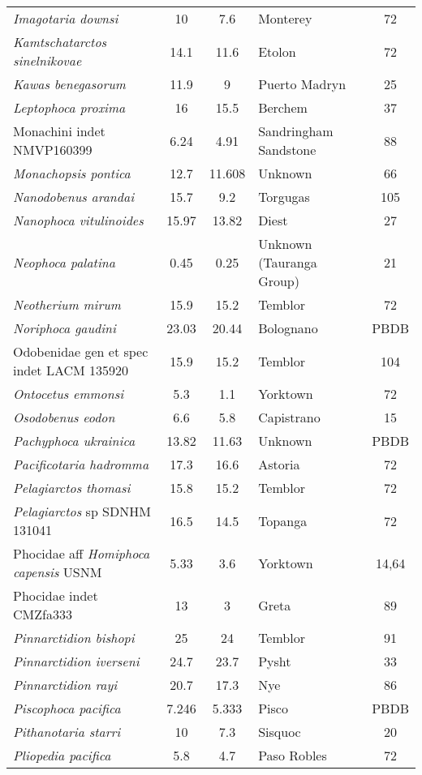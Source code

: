 \begin{longtable}{p{}cclc}
\textit{Imagotaria downsi} & 	10	&	7.6	&	Monterey	&72\\
\textit{Kamtschatarctos sinelnikovae} & 	14.1	&	11.6	&	Etolon	&72\\
\textit{Kawas benegasorum} & 	11.9	&	9	&	Puerto Madryn	&25\\
\textit{Leptophoca proxima} & 	16	&	15.5	&	Berchem	&37\\
Monachini indet NMVP160399 & 	6.24	&	4.91	&	Sandringham Sandstone	&88\\
\textit{Monachopsis pontica} & 	12.7	&	11.608	&	Unknown	&66\\
\textit{Nanodobenus arandai} & 	15.7	&	9.2	&	Torgugas	&105\\
\textit{Nanophoca vitulinoides} & 	15.97	&	13.82	&	Diest	&27\\
\textit{Neophoca palatina} & 	0.45	&	0.25	&	Unknown (Tauranga Group)	&21\\
\textit{Neotherium mirum} & 	15.9	&	15.2	&	Temblor	&72\\
\textit{Noriphoca gaudini} & 	23.03	&	20.44	&	Bolognano	&PBDB\\
Odobenidae gen et spec indet LACM 135920 & 	15.9	&	15.2	&	Temblor	&104\\
\textit{Ontocetus emmonsi} & 	5.3	&	1.1	&	Yorktown	&72\\
\textit{Osodobenus eodon} & 	6.6	&	5.8	&	Capistrano	&15\\
\textit{Pachyphoca ukrainica} & 	13.82	&	11.63	&	Unknown	&PBDB\\
\textit{Pacificotaria hadromma} & 	17.3	&	16.6	&	Astoria	&72\\
\textit{Pelagiarctos thomasi} & 	15.8	&	15.2	&	Temblor	&72\\
\textit{Pelagiarctos} sp SDNHM 131041 & 	16.5	&	14.5	&	Topanga	&72\\
Phocidae aff \textit{Homiphoca capensis} USNM & 	5.33	&	3.6	&	Yorktown	&14,64\\
Phocidae indet CMZfa333 & 	13	&	3	&	Greta	&89\\
\textit{Pinnarctidion bishopi} & 	25	&	24	&	Temblor	&91\\
\textit{Pinnarctidion iverseni} & 	24.7	&	23.7	&	Pysht	&33\\
\textit{Pinnarctidion rayi} & 	20.7	&	17.3	&	Nye	&86\\
\textit{Piscophoca pacifica} & 	7.246	&	5.333	&	Pisco	&PBDB\\
\textit{Pithanotaria starri} & 	10	&	7.3	&	Sisquoc	&20\\
\textit{Pliopedia pacifica} & 	5.8	&	4.7	&	Paso Robles	&72\\

\end{longtable}
